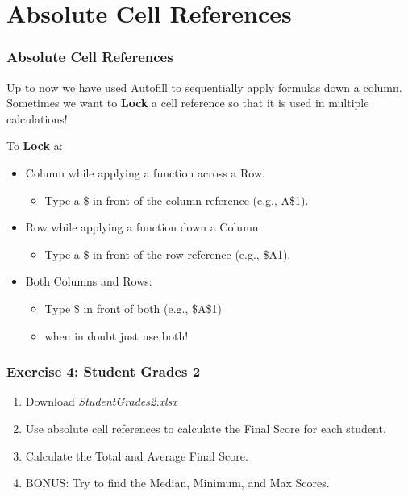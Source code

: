 \documentclass[12pt]{beamer}
\begin{document}
\section{Absolute Cell References}
	\begin{frame}
		\frametitle{Absolute Cell References}
		Up to now we have used Autofill to sequentially apply formulas down a column. 
		Sometimes we want to  \textbf{Lock} a cell reference so that it is used in multiple calculations!
		
		To \textbf{Lock} a:
		\begin{itemize}
			\item Column while applying a function across a Row.
			\begin{itemize}
				\item Type a \$ in front of the column reference (e.g., A\$1).
			\end{itemize}
			\item Row while applying a function down a Column.
				\begin{itemize}
				\item Type a \$ in front of the row reference (e.g., \$A1).
				\end{itemize}
			\item Both Columns and Rows: 
				\begin{itemize}
					\item Type \$ in front of both (e.g., \$A\$1)
					\item when in doubt just use both!
				\end{itemize}
			\end{itemize}
			\end{frame}
	\begin{frame}
		\frametitle{Exercise 4: Student Grades 2}
		\begin{enumerate}
			\item Download \textit{ StudentGrades2.xlsx}
			\item Use absolute cell references to calculate the Final Score for each student.
			\item Calculate the Total and Average Final Score. 
			\item BONUS: Try to find the Median, Minimum, and Max Scores.  
		\end{enumerate}
	\end{frame}
\end{document}
